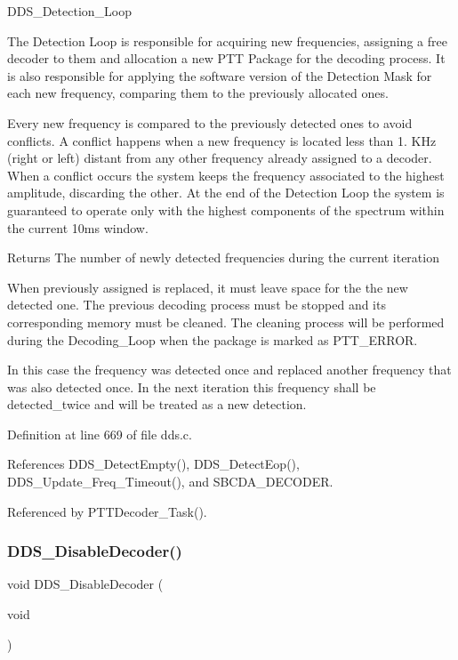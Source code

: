 D\+D\+S\+\_\+\+Detection\+\_\+\+Loop

The Detection Loop is responsible for acquiring new frequencies, assigning a free decoder to them and allocation a new P\+TT Package for the decoding process. It is also responsible for applying the software version of the Detection Mask for each new frequency, comparing them to the previously allocated ones.

Every new frequency is compared to the previously detected ones to avoid conflicts. A conflict happens when a new frequency is located less than 1. K\+Hz (right or left) distant from any other frequency already assigned to a decoder. When a conflict occurs the system keeps the frequency associated to the highest amplitude, discarding the other. At the end of the Detection Loop the system is guaranteed to operate only with the highest components of the spectrum within the current 10ms window.

\begin{DoxyReturn}{Returns}
The number of newly detected frequencies during the current iteration 
\end{DoxyReturn}
When previously assigned is replaced, it must leave space for the the new detected one. The previous decoding process must be stopped and its corresponding memory must be cleaned. The cleaning process will be performed during the Decoding\+\_\+\+Loop when the package is marked as P\+T\+T\+\_\+\+E\+R\+R\+OR.

In this case the frequency was detected once and replaced another frequency that was also detected once. In the next iteration this frequency shall be \textquotesingle{}detected\+\_\+twice\textquotesingle{} and will be treated as a new detection.

Definition at line 669 of file dds.\+c.



References D\+D\+S\+\_\+\+Detect\+Empty(), D\+D\+S\+\_\+\+Detect\+Eop(), D\+D\+S\+\_\+\+Update\+\_\+\+Freq\+\_\+\+Timeout(), and S\+B\+C\+D\+A\+\_\+\+D\+E\+C\+O\+D\+ER.



Referenced by P\+T\+T\+Decoder\+\_\+\+Task().

\mbox{\label{group___d_d_s_ga17065a48b0ce7ad24740a144bb24fb55}} 
\subsubsection{\texorpdfstring{D\+D\+S\+\_\+\+Disable\+Decoder()}{DDS\_DisableDecoder()}}
{\footnotesize\ttfamily void D\+D\+S\+\_\+\+Disable\+Decoder (\begin{DoxyParamCaption}\item[{void}]{ }\end{DoxyParamCaption})}

